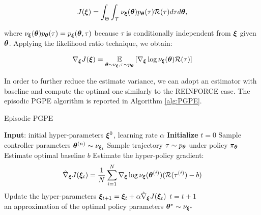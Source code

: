 \begin{align}
J(\boldsymbol{\xi}) = \int_{\Theta}\int_{\mathcal{T}}\nu_{\boldsymbol{\xi}}(\boldsymbol{\theta})p_{\boldsymbol{\theta}}(\tau)\mathcal{R}(\tau)d\tau d\boldsymbol{\theta}, 
\end{align}

where $\nu_{\boldsymbol{\xi}}(\boldsymbol{\theta})p_{\boldsymbol{\theta}}(\tau)=p_{\boldsymbol{\xi}}(\boldsymbol{\theta},\tau)$ because $\tau$ is conditionally independent from $\boldsymbol{\xi}$ given $\boldsymbol{\theta}$. Applying the likelihood ratio technique, we obtain:

\begin{align}
\nabla_{\boldsymbol{\xi}}J(\boldsymbol{\xi}) = \underset{\boldsymbol{\theta}\sim\nu_{\boldsymbol{\xi}}, \tau\sim p_{\boldsymbol{\theta}}}{\mathbb{E}}\left[{\nabla_{\boldsymbol{\xi}}\log\nu_{\boldsymbol{\xi}}(\boldsymbol{\theta})\mathcal{R}(\tau)}\right] 
\end{align}

In order to further reduce the estimate variance, we can adopt an estimator with baseline and compute the optimal one similarly to the REINFORCE case. The episodic \gls{PGPE} algorithm is reported in Algorithm \ref{alg:PGPE}.

\begin{algorithm}[t]
	\caption{Episodic PGPE}
	\label{alg:PGPE}
	\begin{algorithmic}[1]
	\State \textbf{Input}: initial hyper-parameters $\boldsymbol{\xi}^{0}$, learning rate $\alpha$
	\State \textbf{Initialize} $t=0$
			\State Sample controller parameters $\boldsymbol{\theta}^{(n)} \sim\nu_{\boldsymbol{\xi}_t}$
			\State Sample trajectory $\tau\sim p_{\boldsymbol{\theta}}$ under policy $\pi_{\boldsymbol{\theta}}$
		\EndFor 
		\State Estimate optimal baseline $b$
		\State Estimate the hyper-policy gradient:
		\begin{align*}
		\hat{\nabla}_{\boldsymbol{\xi}}J(\boldsymbol{\xi}_t) = \frac{1}{N}\sum_{i=1}^{N}\nabla_{\boldsymbol{\xi}}\log \nu_{\boldsymbol{\xi}}(\boldsymbol{\theta}^{(i)})(\mathcal{R}(\tau^{(i)}) - b)
		\end{align*}
		\State Update the hyper-parameters $\boldsymbol{\xi}_{t+1} = \boldsymbol{\xi}_{t}+\alpha\hat{\nabla}_{\boldsymbol{\xi}}J(\boldsymbol{\xi}_t)$
		\State $t = t + 1$
	\EndWhile \\
	\Return an approximation of the optimal policy parameters $\boldsymbol{\theta}^* \sim \nu_{\boldsymbol{\xi}^*}$
	\end{algorithmic}
\end{algorithm}

  

